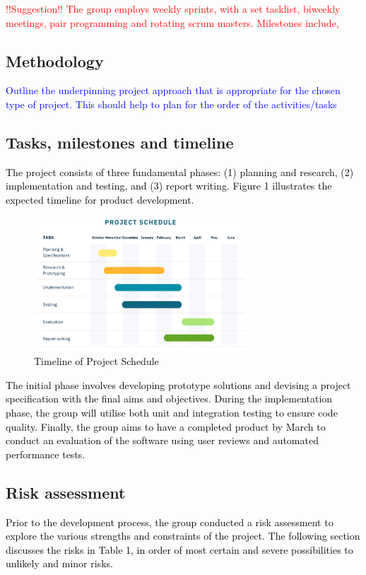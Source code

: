 \documentclass[acmtog, nonacm]{acmart}
\begin{document}
\textcolor{red}{!!Suggestion!! The group employs weekly sprints, with a set tasklist, biweekly meetings, pair programming and rotating scrum masters. Milestones include, }

\subsection{Methodology}
\textcolor{blue}{Outline the underpinning project approach that is appropriate for the chosen type of project. This should help to plan for the order of the activities/tasks}


\subsection{Tasks, milestones and timeline}
\textcolor{black}{The project consists of three fundamental phases: (1) planning and research, (2) implementation and testing, and (3) report writing. Figure 1 illustrates the expected timeline for product development. 
\begin{figure}[htp]
    \centering
    \includegraphics[width=8cm]{project-timeline.png}
    \caption{Timeline of Project Schedule}
    \label{fig:schedule}
\end{figure}}

\textcolor{black}{The initial phase involves developing prototype solutions and devising a project specification with the final aims and objectives. During the implementation phase, the group will utilise both unit and integration testing to ensure code quality. Finally, the group aims to have a completed product by March to conduct an evaluation of the software using user reviews and automated performance tests. }

\subsection{Risk assessment}
\textcolor{black}{Prior to the development process, the group conducted a risk assessment to explore the various strengths and constraints of the project. The following section discusses the risks in Table 1, in order of most certain and severe possibilities to unlikely and minor risks.}
\end{document}
